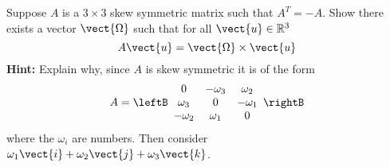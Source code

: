 \begin{enumialphparenastyle}
\begin{ex} Suppose $A$ is a $3\times 3$ skew symmetric matrix such that $A^{T}=-A$. Show
there exists a vector $\vect{\Omega }$ such that for all $\vect{u}\in
\mathbb{R}^{3}$
\begin{equation*}
A\vect{u}=\vect{\Omega} \times \vect{u}
\end{equation*}
\textbf{Hint: }Explain why, since $A$ is skew symmetric it is of the form
\begin{equation*}
A=\leftB
\begin{array}{ccc}
0 & -\omega _{3} & \omega _{2} \\
\omega _{3} & 0 & -\omega _{1} \\
-\omega _{2} & \omega _{1} & 0
\end{array}
\rightB
\end{equation*}
where the $\omega _{i}$ are numbers. Then consider $\omega _{1}\vect{i}
+\omega _{2}\vect{j}+\omega _{3}\vect{k}$.
\end{ex}

\end{enumialphparenastyle}